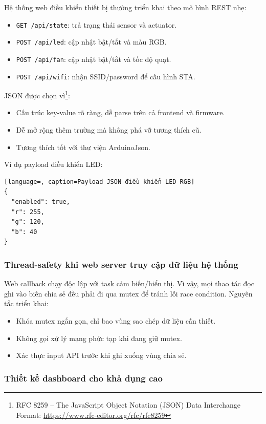 Hệ thống web điều khiển thiết bị thường triển khai theo mô hình REST nhẹ:
\begin{itemize}
    \item \texttt{GET /api/state}: trả trạng thái sensor và actuator.
    \item \texttt{POST /api/led}: cập nhật bật/tắt và màu RGB.
    \item \texttt{POST /api/fan}: cập nhật bật/tắt và tốc độ quạt.
    \item \texttt{POST /api/wifi}: nhận SSID/password để cấu hình STA.
\end{itemize}

JSON được chọn vì\footnote{RFC 8259 -- The JavaScript Object Notation (JSON) Data Interchange Format: \url{https://www.rfc-editor.org/rfc/rfc8259}}:
\begin{itemize}
    \item Cấu trúc key-value rõ ràng, dễ parse trên cả frontend và firmware.
    \item Dễ mở rộng thêm trường mà không phá vỡ tương thích cũ.
    \item Tương thích tốt với thư viện ArduinoJson.
\end{itemize}

Ví dụ payload điều khiển LED:
\begin{lstlisting}[language=, caption=Payload JSON điều khiển LED RGB]
{
  "enabled": true,
  "r": 255,
  "g": 120,
  "b": 40
}
\end{lstlisting}

\subsubsection*{Thread-safety khi web server truy cập dữ liệu hệ thống}

Web callback chạy độc lập với task cảm biến/hiển thị. Vì vậy, mọi thao tác đọc ghi vào biến chia sẻ đều phải đi qua mutex để tránh lỗi race condition. Nguyên tắc triển khai:
\begin{itemize}
    \item Khóa mutex ngắn gọn, chỉ bao vùng sao chép dữ liệu cần thiết.
    \item Không gọi xử lý mạng phức tạp khi đang giữ mutex.
    \item Xác thực input API trước khi ghi xuống vùng chia sẻ.
\end{itemize}

\subsubsection*{Thiết kế dashboard cho khả dụng cao}

